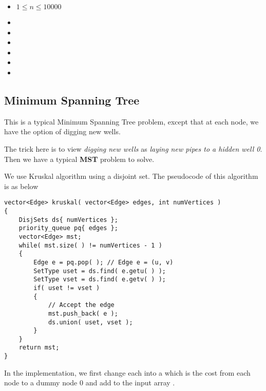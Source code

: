 \begin{itemize}
\item $1 \leq n \leq 10000$
\item {}
\item {}
\item {}
\item {}
\item {}
\item {}
\end{itemize}

\subsection{Minimum Spanning Tree}
This is a typical Minimum Spanning Tree problem, except that at each node, we have the option of digging new wells.

The trick here is to view \textit{digging new wells} as \textit{laying new pipes to a hidden well 0}. Then we have a typical \textbf{MST} problem to solve.

We use Kruskal algorithm using a disjoint set. The pseudocode of this algorithm is as below

\setcounter{lstlisting}{0}
\begin{lstlisting}[style=customc, caption={Kruskal's Algorithm}]
vector<Edge> kruskal( vector<Edge> edges, int numVertices )
{
    DisjSets ds{ numVertices };
    priority_queue pq{ edges };
    vector<Edge> mst;
    while( mst.size( ) != numVertices - 1 )
    {
        Edge e = pq.pop( ); // Edge e = (u, v)
        SetType uset = ds.find( e.getu( ) );
        SetType vset = ds.find( e.getv( ) );
        if( uset != vset )
        {
            // Accept the edge
            mst.push_back( e );
            ds.union( uset, vset );
        }
    }
    return mst;
}
\end{lstlisting}

In the implementation, we first change each  into a  which is the cost from each node to a dummy node 0 and add to the input array .

